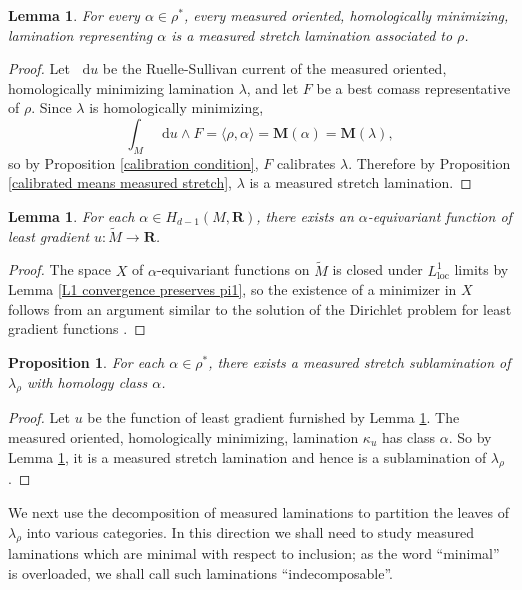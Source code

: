 \documentclass[reqno,11pt]{amsart}
\newcommand{\RR}{\mathbf{R}}
\newcommand*\dif{\mathop{}\!\mathrm{d}}
\newcommand{\Mass}{\mathbf M}
\newcommand{\loc}{\mathrm{loc}}
\newtheorem{lemma}[theorem]{Lemma}
\newtheorem{proposition}[theorem]{Proposition}
\theoremstyle{definition}
\numberwithin{equation}{section}
\begin{document}
\begin{lemma}\label{homologically minimizing means measured stretch}
For every $\alpha \in \rho^*$, every measured oriented, homologically minimizing, lamination representing $\alpha$ is a measured stretch lamination associated to $\rho$.
\end{lemma}
\begin{proof}
Let $\dif u$ be the Ruelle-Sullivan current of the measured oriented, homologically minimizing lamination $\lambda$, and let $F$ be a best comass representative of $\rho$.
Since $\lambda$ is homologically minimizing,
$$\int_M \dif u \wedge F = \langle \rho, \alpha\rangle = \Mass(\alpha) = \Mass(\lambda),$$
so by Proposition \ref{calibration condition}, $F$ calibrates $\lambda$.
Therefore by Proposition \ref{calibrated means measured stretch}, $\lambda$ is a measured stretch lamination.
\end{proof}

\begin{lemma}\label{existence for least gradient}
For each $\alpha \in H_{d - 1}(M, \RR)$, there exists an $\alpha$-equivariant function of least gradient $u: \tilde M \to \RR$.
\end{lemma}
\begin{proof}
The space $X$ of $\alpha$-equivariant functions on $\tilde M$ is closed under $L^1_\loc$ limits by Lemma \ref{L1 convergence preserves pi1}, so the existence of a minimizer in $X$ follows from an argument similar to the solution of the Dirichlet problem for least gradient functions \cite[Theorem 1.20]{Giusti77}.
\end{proof}

\begin{proposition}\label{enough measures in canonical lamination}
For each $\alpha \in \rho^*$, there exists a measured stretch sublamination of $\lambda_\rho$ with homology class $\alpha$.
\end{proposition}
\begin{proof}
Let $u$ be the function of least gradient furnished by Lemma \ref{existence for least gradient}.
The measured oriented, homologically minimizing, lamination $\kappa_u$ has class $\alpha$.
So by Lemma \ref{homologically minimizing means measured stretch}, it is a measured stretch lamination and hence is a sublamination of $\lambda_\rho$.
\end{proof}

We next use the decomposition of measured laminations \cite[{\S}I.3]{Morgan88} to partition the leaves of $\lambda_\rho$ into various categories.
In this direction we shall need to study measured laminations which are minimal with respect to inclusion; as the word ``minimal'' is overloaded, we shall call such laminations ``indecomposable''.
\end{document}
